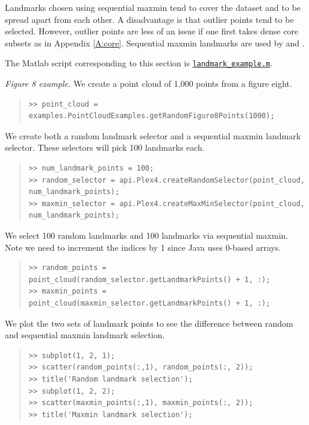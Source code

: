 \documentclass[amscd, amssymb, verbatim]{amsart}[12pt]
\theoremstyle{remark}
\theoremstyle{remark}
\theoremstyle{remark}
\begin{document}
Landmarks chosen using sequential maxmin tend to cover the dataset and to be spread apart from each other. A disadvantage is that outlier points tend to be selected. However, outlier points are less of an issue if one first takes dense core subsets as in Appendix \ref{A:core}. Sequential maxmin landmarks are used by \citet{Range} and \citet{KleinBottle}. 

The Matlab script corresponding to this section is \href{https://github.com/appliedtopology/javaplex/tree/master/src/matlab/for_distribution/tutorial_examples/landmark_example.m}{\texttt{landmark\_example.m}}.

{\em Figure 8 example.} We create a point cloud of 1,000 points from a figure eight.

\begin{quote} \begin{verbatim}
>> point_cloud = examples.PointCloudExamples.getRandomFigure8Points(1000);
\end{verbatim} \end{quote}

We create both a random landmark selector and a sequential maxmin landmark selector. These selectors will pick 100 landmarks each.

\begin{quote} \begin{verbatim}
>> num_landmark_points = 100;
>> random_selector = api.Plex4.createRandomSelector(point_cloud, num_landmark_points);
>> maxmin_selector = api.Plex4.createMaxMinSelector(point_cloud, num_landmark_points);
\end{verbatim} \end{quote}

We select 100 random landmarks and 100 landmarks via sequential maxmin. Note we need to increment the indices by 1 since Java uses 0-based arrays.

\begin{quote} \begin{verbatim}
>> random_points = point_cloud(random_selector.getLandmarkPoints() + 1, :);
>> maxmin_points = point_cloud(maxmin_selector.getLandmarkPoints() + 1, :);
\end{verbatim} \end{quote}

We plot the two sets of landmark points to see the difference between random and sequential maxmin landmark selection.

\begin{quote} \begin{verbatim}
>> subplot(1, 2, 1);
>> scatter(random_points(:,1), random_points(:, 2));
>> title('Random landmark selection');
>> subplot(1, 2, 2);
>> scatter(maxmin_points(:,1), maxmin_points(:, 2));
>> title('Maxmin landmark selection');
\end{verbatim} \end{quote}
\end{document}
